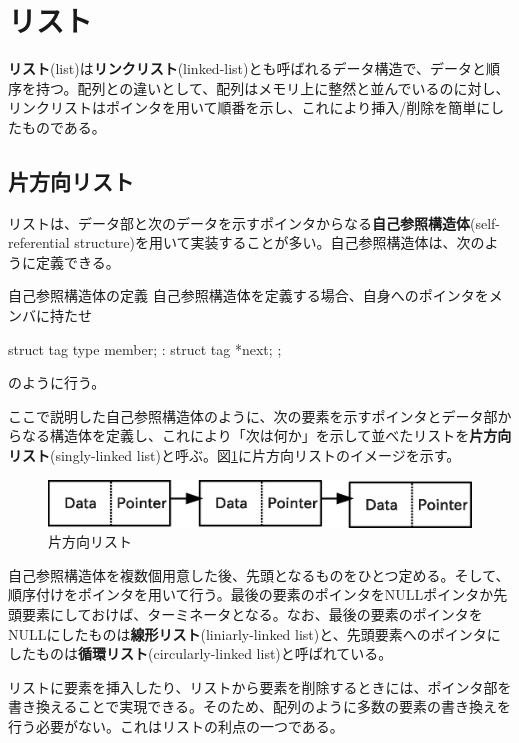 \section{リスト}
\textbf{リスト}(list)は\textbf{リンクリスト}(linked-list)とも呼ばれるデータ構造で、データと順序を持つ。配列との違いとして、配列はメモリ上に整然と並んでいるのに対し、リンクリストはポインタを用いて順番を示し、これにより挿入/削除を簡単にしたものである。
\subsection{片方向リスト}
リストは、データ部と次のデータを示すポインタからなる\textbf{自己参照構造体}(self-referential structure)を用いて実装することが多い。自己参照構造体は、次のように定義できる。
\begin{itembox}[l]{自己参照構造体の定義}
自己参照構造体を定義する場合、自身へのポインタをメンバに持たせ
\begin{code}
struct tag{
  type member;
     :
  struct tag *next;
};
\end{code}
のように行う。
\end{itembox}

ここで説明した自己参照構造体のように、次の要素を示すポインタとデータ部からなる構造体を定義し、これにより「次は何か」を示して並べたリストを\textbf{片方向リスト}(singly-linked list)と呼ぶ。図\ref{Singly}に片方向リストのイメージを示す。
\begin{figure}[htb]
\centering
\includegraphics[width=0.75\linewidth,keepaspectratio]{fig13_1.eps}
\caption{片方向リスト}\label{Singly}
\end{figure}

自己参照構造体を複数個用意した後、先頭となるものをひとつ定める。そして、順序付けをポインタを用いて行う。最後の要素のポインタをNULLポインタか先頭要素にしておけば、ターミネータとなる。なお、最後の要素のポインタをNULLにしたものは\textbf{線形リスト}(liniarly-linked list)と、先頭要素へのポインタにしたものは\textbf{循環リスト}(circularly-linked list)と呼ばれている。

リストに要素を挿入したり、リストから要素を削除するときには、ポインタ部を書き換えることで実現できる。そのため、配列のように多数の要素の書き換えを行う必要がない。これはリストの利点の一つである。

